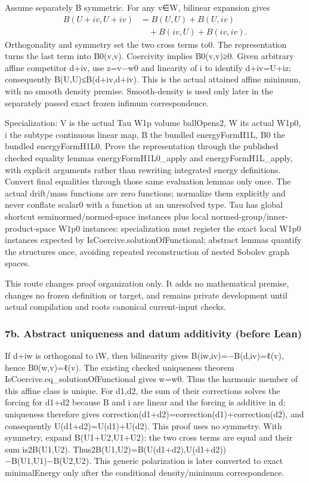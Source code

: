 \documentclass[11pt]{article}
\theoremstyle{definition}
\theoremstyle{remark}
\numberwithin{equation}{section}
\begin{document}
Assume separately B symmetric. For any v∈W, bilinear expansion gives
\begin{align*}B(U+iv,U+iv)&=B(U,U)+B(U,iv)\\ &\quad+B(iv,U)+B(iv,iv).\end{align*} Orthogonality and symmetry
set the two cross terms to0. The representation turns the last term into
B0(v,v). Coercivity implies B0(v,v)≥0. Given arbitrary affine competitor
d+iv, use z=v−w0 and linearity of i to identify d+iv=U+iz; consequently
B(U,U)≤B(d+iv,d+iv). This is the actual attained affine minimum, with no
smooth density premise. Smooth-density is used only later in the
separately passed exact frozen infimum correspondence.

Specialization: V is the actual Tau W1p volume ballOpens2, W its actual
W1p0, i the subtype continuous linear map, B the bundled energyFormH1L,
B0 the bundled energyFormH1L0. Prove the representation through the
published checked equality lemmas energyFormH1L0\_apply and
energyFormH1L\_apply, with explicit arguments rather than rewriting
integrated energy definitions. Convert final equalities through those
same evaluation lemmas only once. The actual drift/mass functions are
zero functions; normalize them explicitly and never conflate scalar0
with a function at an unresolved type. Tau has global shortcut
seminormed/normed-space instances plus local
normed-group/inner-product-space W1p0 instances: specialization must
register the exact local W1p0 instances expected by
IsCoercive.solutionOfFunctional; abstract lemmas quantify the structures
once, avoiding repeated reconstruction of nested Sobolev graph spaces.

This route changes proof organization only. It adds no mathematical
premise, changes no frozen definition or target, and remains private
development until actual compilation and root\textquotesingle s
canonical current-input checks.

\hypertarget{source-1efa4a952efe-b.-abstract-uniqueness-and-datum-additivity-before-lean}{%
\subsubsection{7b. Abstract uniqueness and datum additivity (before
Lean)}\label{source-1efa4a952efe-b.-abstract-uniqueness-and-datum-additivity-before-lean}}

If d+iw is orthogonal to iW, then bilinearity gives
B(iw,iv)=−B(d,iv)=ℓ(v), hence B0(w,v)=ℓ(v). The existing checked
uniqueness theorem IsCoercive.eq\_solutionOfFunctional gives w=w0. Thus
the harmonic member of this affine class is unique. For d1,d2, the sum
of their corrections solves the forcing for d1+d2 because B and i are
linear and the forcing is additive in d; uniqueness therefore gives
correction(d1+d2)=correction(d1)+correction(d2), and consequently
U(d1+d2)=U(d1)+U(d2). This proof uses no symmetry. With symmetry, expand
B(U1+U2,U1+U2): the two cross terms are equal and their sum is2B(U1,U2).
Thus2B(U1,U2)=B(U(d1+d2),U(d1+d2))−B(U1,U1)−B(U2,U2). This generic
polarization is later converted to exact minimalEnergy only after the
conditional density/minimum correspondence.
\end{document}
